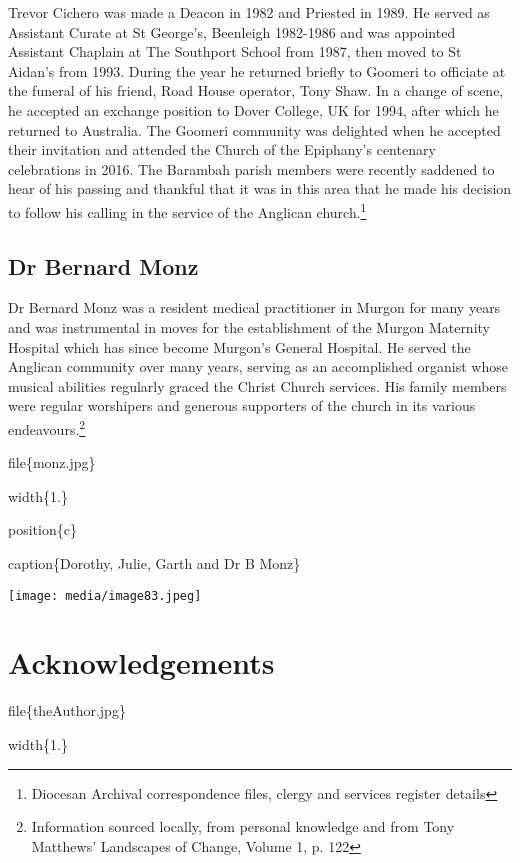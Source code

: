 Trevor Cichero was made a Deacon in 1982 and Priested in 1989. He served as Assistant Curate at St George's, Beenleigh 1982-1986 and was appointed Assistant Chaplain at The Southport School from 1987, then moved to St Aidan's from 1993. During the year he returned briefly to Goomeri to officiate at the funeral of his friend, Road House operator, Tony Shaw. In a change of scene, he accepted an exchange position to Dover College, UK for 1994, after which he returned to Australia. The Goomeri community was delighted when he accepted their invitation and attended the Church of the Epiphany's centenary celebrations in 2016. The Barambah parish members were recently saddened to hear of his passing and thankful that it was in this area that he made his decision to follow his calling in the service of the Anglican church.\footnote{Diocesan Archival correspondence files, clergy and services register details}

\hypertarget{dr-bernard-monz}{%
\section{Dr Bernard Monz}\label{dr-bernard-monz}}

Dr Bernard Monz was a resident medical practitioner in Murgon for many years and was instrumental in moves for the establishment of the Murgon Maternity Hospital which has since become Murgon's General Hospital. He served the Anglican community over many years, serving as an accomplished organist whose musical abilities regularly graced the Christ Church services. His family members were regular worshipers and generous supporters of the church in its various endeavours.\footnote{Information sourced locally, from personal knowledge and from Tony Matthews' Landscapes of Change, Volume 1, p. 122}

file\{monz.jpg\}

width\{1.\}

position\{c\}

caption\{Dorothy, Julie, Garth and Dr B Monz\}

\texttt{[image: media/image83.jpeg]}

\hypertarget{acknowledgements}{%
\chapter{Acknowledgements}\label{acknowledgements}}

file\{theAuthor.jpg\}

width\{1.\}

